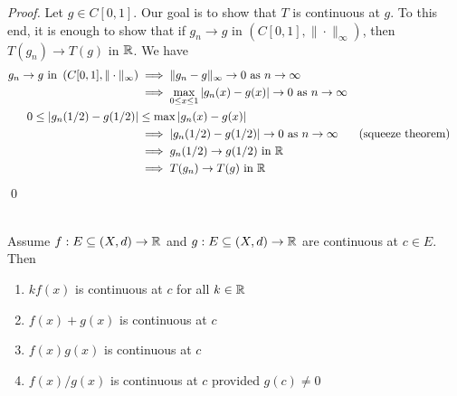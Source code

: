 \begin{proof}
    Let $g\in C[0,1].$ Our goal is to show that $T$ is continuous at $g$. To this end, it is enough to show that if $g_n \to g$ in $\left(C[0,1], \|\cdot\|_{\infty}\right)$, then $T(g_n) \to T(g)$ in $\mathbb{R}$. We have 
    \begin{align*}
        g_n \to g \text{ in } \left(C[0,1], \| \cdot \|_{\infty}\right)
        &\implies \|g_n - g\|_{\infty} \to 0 \text{ as } n \to \infty \\
        &\implies \max \limits_{0 \leq x \leq 1} \left|g_n(x) - g(x)\right| \to 0 \text{ as } n \to \infty \\
        0 \leq \left|g_n (1/2) - g(1/2)\right| &\leq \max\left|g_n(x) - g(x)\right| \\
        &\implies \left|g_n(1/2) - g(1/2)\right| \to 0 \text{ as } n \to \infty &&\text{(squeeze theorem)} \\
        &\implies g_n(1/2) \to g(1/2) \text{ in } \mathbb{R} \\
        &\implies T(g_n) \to T(g) \text{ in } \mathbb{R}
    \end{align*}
    \qed
\end{proof}

\begin{theorem} \leavevmode \\
    \label{thm4.9}
    Assume $f:E \subseteq (X,d) \to \mathbb{R}$ and $g:E \subseteq (X,d) \to \mathbb{R}$ are continuous at $c\in E$. Then
    \begin{enumerate}[$(i)$]
        \item $kf(x)$ is continuous at $c$ for all $k\in\mathbb{R}$
        \item $f(x) + g(x)$ is continuous at $c$
        \item $f(x)g(x)$ is continuous at $c$
        \item $f(x)/g(x)$ is continuous at $c$ provided $g(c) \not = 0$
    \end{enumerate}
\end{theorem}

